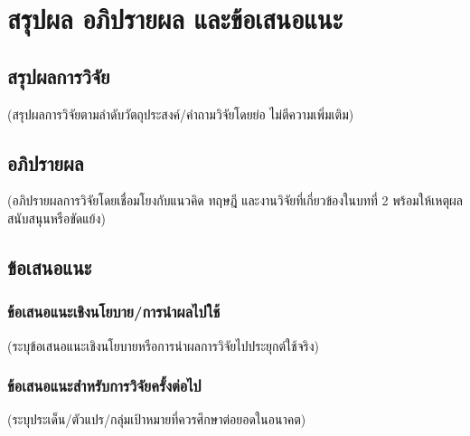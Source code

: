 \chapter{สรุปผล อภิปรายผล และข้อเสนอแนะ}

\section{สรุปผลการวิจัย}
(สรุปผลการวิจัยตามลำดับวัตถุประสงค์/คำถามวิจัยโดยย่อ ไม่ตีความเพิ่มเติม)

\section{อภิปรายผล}
(อภิปรายผลการวิจัยโดยเชื่อมโยงกับแนวคิด ทฤษฎี และงานวิจัยที่เกี่ยวข้องในบทที่ 2
พร้อมให้เหตุผลสนับสนุนหรือขัดแย้ง)

\section{ข้อเสนอแนะ}
\subsection{ข้อเสนอแนะเชิงนโยบาย/การนำผลไปใช้}
(ระบุข้อเสนอแนะเชิงนโยบายหรือการนำผลการวิจัยไปประยุกต์ใช้จริง)

\subsection{ข้อเสนอแนะสำหรับการวิจัยครั้งต่อไป}
(ระบุประเด็น/ตัวแปร/กลุ่มเป้าหมายที่ควรศึกษาต่อยอดในอนาคต)
